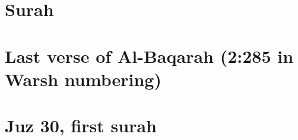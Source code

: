 \documentclass{article}
\begin{document}
\parindent=0pt
\thispagestyle{empty}

\section*{Surah \surahname[1]}
\begin{arab}[utf]
  \quransurah[1]
\end{arab}

\section*{Last verse of Al-Baqarah (2:285 in Warsh numbering)}
\begin{arab}[utf]
  \quranayah[2][285]
\end{arab}

\section*{Juz 30, first surah}
\begin{arab}[utf]
  \quransurah*[78]
\end{arab}
\end{document}
